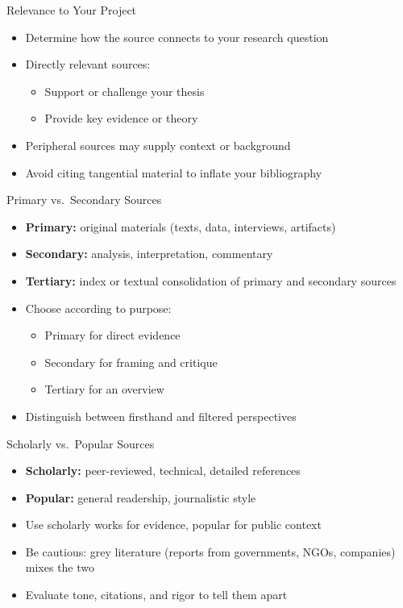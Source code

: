 \documentclass[aspectratio=169]{beamer}
\begin{document}
\begin{frame}{Relevance to Your Project}
\begin{itemize}
  \item Determine how the source connects to your research question
  \item Directly relevant sources:
    \begin{itemize}
      \item Support or challenge your thesis
      \item Provide key evidence or theory
    \end{itemize}
  \item Peripheral sources may supply context or background
  \item Avoid citing tangential material to inflate your bibliography
\end{itemize}
\end{frame}

\begin{frame}{Primary vs.\ Secondary Sources}
\begin{itemize}
  \item \textbf{Primary:} original materials (texts, data, interviews, artifacts)
  \item \textbf{Secondary:} analysis, interpretation, commentary
  \item  \textbf{Tertiary:} index or textual consolidation of  primary and secondary sources
  \item Choose according to purpose:
    \begin{itemize}
      \item Primary for direct evidence
      \item Secondary for framing and critique
      \item Tertiary for an overview
    \end{itemize}
  \item Distinguish between firsthand and filtered perspectives
\end{itemize}
\end{frame}

\begin{frame}{Scholarly vs.\ Popular Sources}
\begin{itemize}
  \item \textbf{Scholarly:} peer-reviewed, technical, detailed references
  \item \textbf{Popular:} general readership, journalistic style
  \item Use scholarly works for evidence, popular for public context
  \item Be cautious: grey literature (reports from governments, NGOs, companies) mixes the two
  \item Evaluate tone, citations, and rigor to tell them apart
\end{itemize}
\end{frame}
\end{document}
